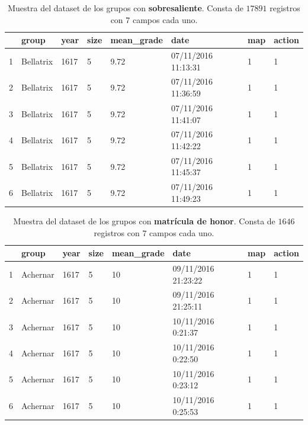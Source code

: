 \begin{table}[ht]
\centering
\begin{tabular}{rlllllll}
  \hline
 & group & year & size & mean\_grade & date & map & action \\ 
  \hline
1 & Bellatrix & 1617 & 5 & 9.72 & 07/11/2016 11:13:31 & 1 & 1 \\ 
  2 & Bellatrix & 1617 & 5 & 9.72 & 07/11/2016 11:36:59 & 1 & 1 \\ 
  3 & Bellatrix & 1617 & 5 & 9.72 & 07/11/2016 11:41:07 & 1 & 1 \\ 
  4 & Bellatrix & 1617 & 5 & 9.72 & 07/11/2016 11:42:22 & 1 & 1 \\ 
  5 & Bellatrix & 1617 & 5 & 9.72 & 07/11/2016 11:45:37 & 1 & 1 \\ 
  6 & Bellatrix & 1617 & 5 & 9.72 & 07/11/2016 11:49:23 & 1 & 1 \\ 
   \hline
\end{tabular}
\caption{Muestra del dataset de los grupos con \textbf{sobresaliente}. Consta de $17891$ registros con $7$ campos cada uno.}
\label{table:14}
\end{table}

\begin{table}[ht]
\centering
\begin{tabular}{rlllllll}
  \hline
 & group & year & size & mean\_grade & date & map & action \\ 
  \hline
1 & Achernar & 1617 & 5 & 10 & 09/11/2016 21:23:22 & 1 & 1 \\ 
  2 & Achernar & 1617 & 5 & 10 & 09/11/2016 21:25:11 & 1 & 1 \\ 
  3 & Achernar & 1617 & 5 & 10 & 10/11/2016 0:21:37  & 1 & 1 \\ 
  4 & Achernar & 1617 & 5 & 10 & 10/11/2016 0:22:50  & 1 & 1 \\ 
  5 & Achernar & 1617 & 5 & 10 & 10/11/2016 0:23:12  & 1 & 1 \\ 
  6 & Achernar & 1617 & 5 & 10 & 10/11/2016 0:25:53  & 1 & 1 \\ 
   \hline
\end{tabular}
\caption{Muestra del dataset de los grupos con \textbf{matrícula de honor}. Consta de $1646$ registros con $7$ campos cada uno.}
\label{table:15}
\end{table}
